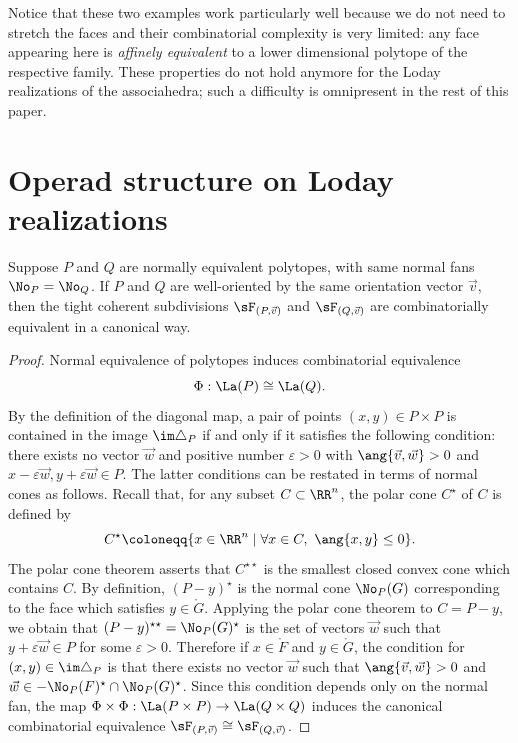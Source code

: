 Notice that these two examples work particularly well because we do not need to stretch the faces and their combinatorial complexity is very limited: any face appearing here is \emph{affinely equivalent} to a lower dimensional polytope of the respective family. These properties do not hold anymore for the Loday realizations of the associahedra; such a difficulty is omnipresent in the rest of this paper.

\section{Operad structure on Loday realizations}

\begin{proposition}\label{Prop:NormalFan}
Suppose $P$ and $Q$ are normally equivalent polytopes,
\ie with same normal fans $\No_P=\No_Q$.
If $P$ and $Q$ are well-oriented by the same orientation vector $\vec v$,
then the tight coherent subdivisions
$\sF_{(P, \vec v)}$ and $\sF_{(Q, \vec v)}$ are combinatorially equivalent in a canonical way.
\end{proposition}

\begin{proof}
Normal equivalence of polytopes induces combinatorial equivalence
\[
\Phi: \La(P)\cong\La(Q).
\]
By the definition of the diagonal map, a pair of points $(x, y)\in P\times P$ is contained in the image $\im \triangle_P$ if and only if it satisfies the following condition:
there exists no vector $\vec w$ and positive number $\varepsilon >0$ with $\ang{\vec v, \vec w}>0$ and $x-\varepsilon \vec w, y+\varepsilon\vec w\in P$.
The latter conditions can be restated in terms of normal cones as follows. Recall that,
for any subset $C \subset \RR^n$, the polar cone $C^\star$ of $C$ is defined by
\[
C^\star \coloneqq\{ x\in \RR^n\mid \forall x\in C, \ \ang{x, y} \leq 0\}.
\]
The polar cone theorem asserts that $C^{\star \star}$ is the smallest closed convex cone which contains $C$.
By definition, $(P-y)^\star$ is the normal cone $\No_P(G)$ corresponding to the face which satisfies $y\in \mathring G$.
Applying the polar cone theorem to $C= P-y$, we obtain that $(P-y)^{\star\star} = \No_P(G)^\star$ is the set of vectors $\vec w$ such that $y+\varepsilon\vec w \in P$ for some $\varepsilon >0$.
Therefore if $x\in \mathring F$ and $y\in \mathring G$, the condition for $(x, y)\in \im \triangle_P$ is that
there exists no vector $\vec w$ such that
$\ang{\vec v, \vec w}>0$ and $\vec w\in -\No_P(F)^\star\cap \No_P(G)^\star$.
Since this condition depends only on the normal fan,
the map $\Phi\times \Phi: \La(P\times P)\to \La(Q\times Q)$ induces the canonical combinatorial equivalence $\sF_{(P, \vec v)}\cong \sF_{(Q, \vec v)}$.
\end{proof}

